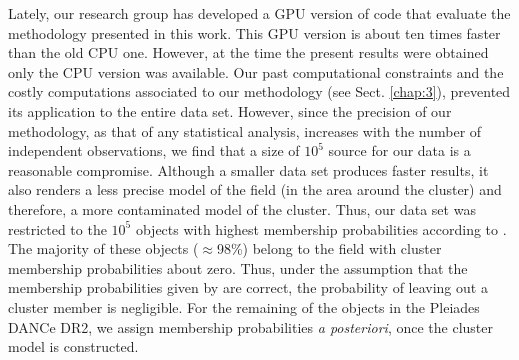 Lately, our research group has developed a GPU version of code that evaluate the methodology presented in this work. This GPU version is about ten times faster than the old CPU one. However, at the time the present results were obtained only the CPU version was available. Our past computational constraints and the costly computations associated to our methodology (see Sect. \ref{chap:3}), prevented its application to the entire data set. However, since the precision of our methodology, as that of any statistical analysis, increases with the number of independent observations, we find that a size of $10^5$ source for our data is a reasonable compromise. Although a smaller data set produces faster results, it also renders a less precise model of the field (in the area around the cluster) and therefore, a more contaminated model of the cluster. Thus, our data set was restricted to the $10^5$ objects with highest membership probabilities according to \citet{Bouy2015}. The majority of these objects ($\approx$98\%) belong to the field with cluster membership probabilities about zero. Thus, under the assumption that the membership probabilities given by \citet{Bouy2015} are correct, the probability of leaving out a cluster member is negligible. For the remaining of the objects in the Pleiades DANCe DR2, we assign membership probabilities \emph{a posteriori}, once the cluster model is constructed. 



